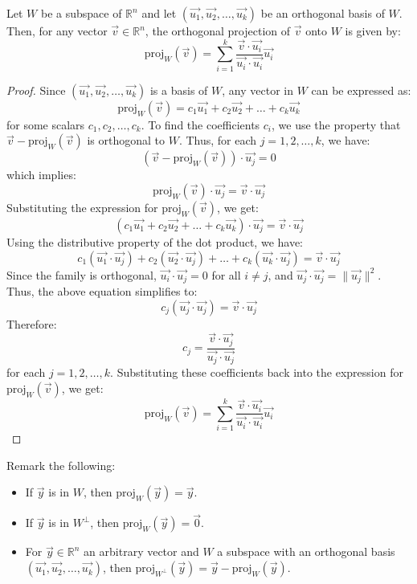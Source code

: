 \begin{theorem}
    Let $W$ be a subspace of $\mathbb{R}^n$ and let $(\vec{u_1}, \vec{u_2}, \ldots, \vec{u_k})$ be an orthogonal basis of $W$. Then, for any vector $\vec{v} \in \mathbb{R}^n$, the orthogonal projection of $\vec{v}$ onto $W$ is given by:
    \[
        \text{proj}_W(\vec{v}) = \sum_{i=1}^{k} \frac{\vec{v} \cdot \vec{u_i}}{\vec{u_i} \cdot \vec{u_i}} \vec{u_i}
    \]
\end{theorem}
\begin{proof}
    Since $(\vec{u_1}, \vec{u_2}, \ldots, \vec{u_k})$ is a basis of $W$, any vector in $W$ can be expressed as:
    \[
        \text{proj}_W(\vec{v}) = c_1 \vec{u_1} + c_2 \vec{u_2} + \ldots + c_k \vec{u_k}
    \]
    for some scalars $c_1, c_2, \ldots, c_k$.
    To find the coefficients $c_i$, we use the property that $\vec{v} - \text{proj}_W(\vec{v})$ is orthogonal to $W$. Thus, for each $j = 1, 2, \ldots, k$, we have:
    \[
        (\vec{v} - \text{proj}_W(\vec{v})) \cdot \vec{u_j} = 0
    \]
    which implies:
    \[
        \text{proj}_W(\vec{v}) \cdot \vec{u_j} = \vec{v} \cdot \vec{u_j}
    \]
    Substituting the expression for $\text{proj}_W(\vec{v})$, we get:
    \[
        (c_1 \vec{u_1} + c_2 \vec{u_2} + \ldots + c_k \vec{u_k}) \cdot \vec{u_j} = \vec{v} \cdot \vec{u_j}
    \]
    Using the distributive property of the dot product, we have:
    \[
        c_1 (\vec{u_1} \cdot \vec{u_j}) + c_2 (\vec{u_2} \cdot \vec{u_j}) + \ldots + c_k (\vec{u_k} \cdot \vec{u_j}) = \vec{v} \cdot \vec{u_j}
    \]
    Since the family is orthogonal, $\vec{u_i} \cdot \vec{u_j} = 0$ for all $i \neq j$, and $\vec{u_j} \cdot \vec{u_j} = \|\vec{u_j}\|^2$. Thus, the above equation simplifies to:
    \[
        c_j (\vec{u_j} \cdot \vec{u_j}) = \vec{v} \cdot \vec{u_j}
    \]
    Therefore:
    \[
        c_j = \frac{\vec{v} \cdot \vec{u_j}}{\vec{u_j} \cdot \vec{u_j}}
    \]
    for each $j = 1, 2, \ldots, k$.
    Substituting these coefficients back into the expression for $\text{proj}_W(\vec{v})$, we get:
    \[
        \text{proj}_W(\vec{v}) = \sum_{i=1}^{k} \frac{\vec{v} \cdot \vec{u_i}}{\vec{u_i} \cdot \vec{u_i}} \vec{u_i}
    \]
\end{proof}
Remark the following:
\begin{itemize}[itemsep=1pt,label=$\circ$]
    \item If $\vec{y}$ is in $W$, then $\text{proj}_W(\vec{y}) = \vec{y}$.
    \item If $\vec{y}$ is in $W^{\perp}$, then $\text{proj}_W(\vec{y}) = \vec{0}$.
    \item For $\vec{y} \in \mathbb{R}^n$ an arbitrary vector and $W$ a subspace with an orthogonal basis $(\vec{u_1}, \vec{u_2}, \ldots, \vec{u_k})$, then $\text{proj}_{W^{\perp}}(\vec{y}) = \vec{y} - \text{proj}_W(\vec{y})$.
\end{itemize}

